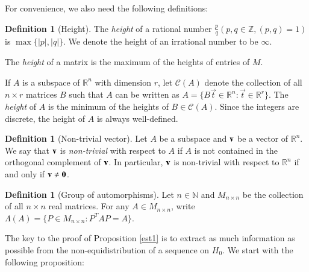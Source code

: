 \documentclass[12pt,amstex]{amsart}
\theoremstyle{definition}
\newtheorem{defn}[thm]{Definition}
\begin{document}
For convenience, we also need the following definitions:
\begin{defn}[Height]
  The \emph{height} of a rational number $\frac{p}{q} (p,q\in\mathbb{Z},(p,q)=1)$ is $\max\{\vert p\vert,\vert q\vert\}$. We denote the height of an irrational number to be $\infty$.

  The \emph{height} of a matrix is the maximum of the heights of entries of $M$.

  If $A$ is a subspace of $\mathbb{R}^{n}$ with dimension $r$, let $\mathcal{C}(A)$ denote the collection of all $n\times r$ matrices $B$ such that $A$ can
  be written as $A=\{B\vec{t}\in\mathbb{R}^{n}\colon\vec{t}\in\mathbb{R}^{r}\}$. The \emph{height} of $A$ is the minimum of the heights of $B\in\mathcal{C}(A)$. Since the integers are discrete, the height of $A$ is always well-defined.
 \end{defn}

  \begin{defn}[Non-trivial vector]
 Let $A$ be a subspace and $\bold{v}$ be a vector of $\mathbb{R}^{n}$. We say that $\bold{v}$ is \emph{non-trivial} with respect to $A$ if $A$ is not contained in the orthogonal complement of $\bold{v}$. In particular, $\bold{v}$ is non-trivial with respect to $\mathbb{R}^{n}$ if and only if $\bold{v}\neq \bold{0}$.
\end{defn}

\begin{defn}[Group of automorphisms]
    Let $n\in\mathbb{N}$ and $M_{n\times n}$ be the collection of all $n\times n$ real matrices.
For any $A\in M_{n\times n}$, write $\Lambda(A)=\{P\in M_{n\times n}\colon P^{T}AP=A\}$.
\end{defn}

  The key to the proof of Proposition \ref{est1} is to extract as much information as possible from the non-equidistribution of a sequence on $H_{0}$. We start with the following proposition:
\end{document}
